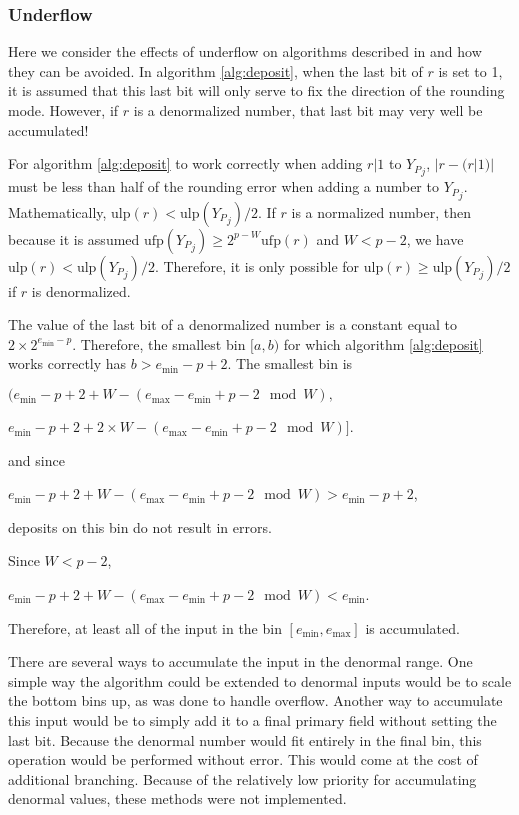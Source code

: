 \documentclass[12pt]{article}
\providecommand{\min}{\ensuremath{\text{min}}}
\providecommand{\max}{\ensuremath{\text{max}}}
\providecommand{\ulp}{\ensuremath{\text{ulp}}}
\providecommand{\ufp}{\ensuremath{\text{ufp}}}
\theoremstyle{plain}
\begin{document}
    \subsubsection{Underflow}
      \label{sec:underflow}
      Here we consider the effects of underflow on algorithms described in \cite{repsum} and how they can be avoided. In algorithm \ref{alg:deposit}, when the last bit of $r$ is set to 1, it is assumed that this last bit will only serve to fix the direction of the rounding mode. However, if $r$ is a denormalized number, that last bit may very well be accumulated!

      For algorithm \ref{alg:deposit} to work correctly when adding $r | 1$ to ${Y_P}_j$, $|r - (r | 1)|$ must be less than half of the rounding error when adding a number to ${Y_P}_j$. Mathematically, $\ulp(r) < \ulp({Y_P}_j)/2$.
      If $r$ is a normalized number, then because it is assumed $\ufp({Y_P}_j) \geq 2^{p - W}\ufp(r)$ and $W < p - 2$, we have $\ulp(r) < \ulp({Y_P}_j)/2$. Therefore, it is only possible for $\ulp(r) \geq \ulp({Y_P}_j)/2$ if $r$ is denormalized.

      The value of the last bit of a denormalized number is a constant equal to $2 \times 2^{e_{\min} - p}$. Therefore, the smallest bin $[a, b)$ for which algorithm \ref{alg:deposit} works correctly has $b > e_{\min} - p + 2$. The smallest bin is

      $(e_{\min} - p + 2 + W - (e_{\max} - e_{\min} + p - 2 \mod W),$

      \indent \indent $e_{\min} - p + 2 + 2 \times W - (e_{\max} - e_{\min} + p - 2 \mod W)]$.

      and since

      $e_{\min} - p + 2 + W - (e_{\max} - e_{\min} + p - 2 \mod W) > e_{\min} - p + 2$,

      deposits on this bin do not result in errors.

      Since $W < p - 2$,

      $e_{\min} - p + 2 + W - (e_{\max} - e_{\min} + p - 2 \mod W) < e_{\min}$.

      Therefore, at least all of the input in the bin $[e_{\min}, e_{\max}]$ is accumulated.

      There are several ways to accumulate the input in the denormal range. One simple way the algorithm could be extended to denormal inputs would be to scale the bottom bins up, as was done to handle overflow. Another way to accumulate this input would be to simply add it to a final primary field without setting the last bit. Because the denormal number would fit entirely in the final bin, this operation would be performed without error. This would come at the cost of additional branching. Because of the relatively low priority for accumulating denormal values, these methods were not implemented.
\end{document}
